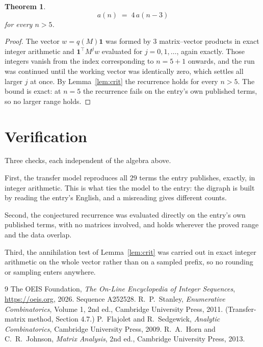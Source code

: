 \documentclass[11pt,a4paper]{article}
\theoremstyle{plain}
\newtheorem{theorem}{Theorem}
\theoremstyle{definition}
\begin{document}
\begin{theorem}
\[
a(n)\;=\;4\,a(n-3)
\]
for every $n>5$.
\end{theorem}

\begin{proof}
The vector $w=q(M)\mathbf{1}$ was formed by $3$ matrix--vector products in exact
integer arithmetic and $\mathbf{1}^{\!\top}M^{j}w$ evaluated for $j=0,1,\dots$, again
exactly. Those integers vanish from the index corresponding to $n=5+1$ onwards, and the
run was continued until the working vector was identically zero, which settles all larger $j$
at once. By Lemma~\ref{lem:crit} the recurrence holds for every $n>5$. The bound is exact: at $n=5$ the recurrence fails on the entry's own published terms, so no larger range holds.
\end{proof}

\section{Verification}

Three checks, each independent of the algebra above.

First, the transfer model reproduces all $29$ terms the entry publishes, exactly, in
integer arithmetic. This is what ties the model to the entry: the digraph is built by reading
the entry's English, and a misreading gives different counts.

Second, the conjectured recurrence was evaluated directly on the entry's own published terms,
with no matrices involved, and holds wherever the proved range and the data overlap.

Third, the annihilation test of Lemma~\ref{lem:crit} was carried out in exact integer
arithmetic on the whole vector rather than on a sampled prefix, so no rounding or sampling
enters anywhere.

\begin{thebibliography}{9}
 The OEIS Foundation, \emph{The On-Line Encyclopedia of Integer
Sequences}, \url{https://oeis.org}, 2026. Sequence A252528.
 R.~P.~Stanley, \emph{Enumerative Combinatorics}, Volume 1, 2nd ed.,
Cambridge University Press, 2011. (Transfer-matrix method, Section 4.7.)
 P.~Flajolet and R.~Sedgewick, \emph{Analytic Combinatorics}, Cambridge
University Press, 2009.
 R.~A.~Horn and C.~R.~Johnson, \emph{Matrix Analysis}, 2nd ed., Cambridge
University Press, 2013.
\end{thebibliography}
\end{document}
